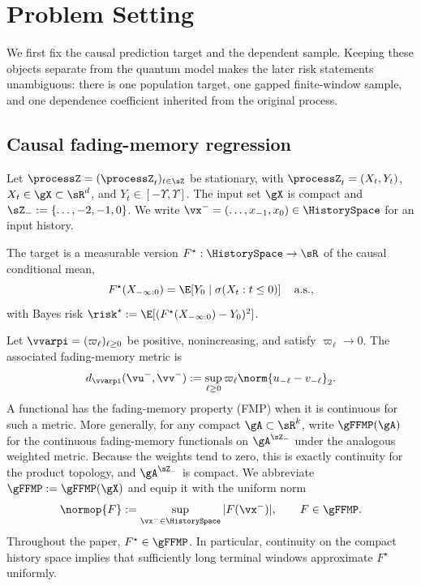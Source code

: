 \section{Problem Setting}
\label{sec:problem-setting}

We first fix the causal prediction target and the dependent sample.  Keeping
these objects separate from the quantum model makes the later risk statements
unambiguous: there is one population target, one gapped finite-window sample,
and one dependence coefficient inherited from the original process.

\subsection{Causal fading-memory regression}

Let $\processZ=(\processZ_t)_{t\in\sZ}$ be stationary, with
$\processZ_t=(X_t,Y_t)$, $X_t\in\gX\subset\sR^d$, and
$Y_t\in[-\Upsilon,\Upsilon]$.  The input set $\gX$ is compact and
$\sZ_-:=\{\ldots,-2,-1,0\}$.  We write
$\vx^-=(\ldots,x_{-1},x_0)\in\HistorySpace$ for an input history.

The target is a measurable version $F^\star:\HistorySpace\to\sR$ of the
causal conditional mean,
\begin{equation}
    F^\star(X_{-\infty:0})
    =\E\!\left[Y_0\mid\sigma(X_t:t\leq0)\right]
    \quad\text{a.s.},
    \label{eq:causal-regression}
\end{equation}
with Bayes risk
$\risk^\star:=\E[(F^\star(X_{-\infty:0})-Y_0)^2]$.

Let $\vvarpi=(\varpi_\ell)_{\ell\geq0}$ be positive, nonincreasing, and satisfy
$\varpi_\ell\to0$.  The associated fading-memory metric is
\begin{equation}
    d_{\vvarpi}(\vu^-,\vv^-)
    :=\sup_{\ell\geq0}\varpi_\ell\norm{u_{-\ell}-v_{-\ell}}_2.
    \label{eq:fading-memory-metric}
\end{equation}
A functional has the fading-memory property (FMP) when it is continuous for
such a metric.  More generally, for any compact $\gA\subset\sR^k$, write
$\gFFMP(\gA)$ for the continuous fading-memory functionals on
$\gA^{\sZ_-}$ under the analogous weighted metric.  Because the weights tend
to zero, this is exactly continuity for the product topology, and
$\gA^{\sZ_-}$ is compact.  We abbreviate $\gFFMP:=\gFFMP(\gX)$ and equip it
with the uniform norm
\begin{equation}
    \normop{F}:=\sup_{\vx^-\in\HistorySpace}|F(\vx^-)|,
    \qquad F\in\gFFMP.
    \label{eq:uniform-norm}
\end{equation}
Throughout the paper, $F^\star\in\gFFMP$.  In particular, continuity on the
compact history space implies that sufficiently long terminal windows
approximate $F^\star$ uniformly.

